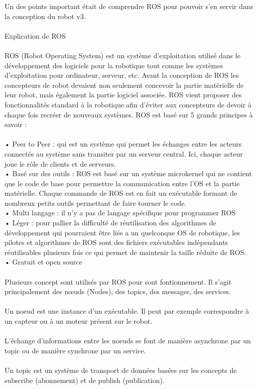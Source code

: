 \documentclass{PackagerQualityN}
\begin{document}
Un des points important était de comprendre ROS pour pouvoir s'en servir dans la conception du robot v3.\\
\\
Explication de ROS\\
\\
ROS (Robot Operating System) est un système d’exploitation utilisé dans le développement des logiciels pour la robotique tout comme les systèmes d’exploitation pour ordinateur, serveur, etc.
Avant la conception de ROS les concepteurs de robot devaient non seulement concevoir la partie matérielle de leur robot, mais également la partie logiciel associée. ROS vient proposer des fonctionnalités standard à la robotique afin d’éviter aux concepteurs de devoir à chaque fois recréer de nouveaux systèmes. ROS est basé sur 5 grands principes à savoir : \\
\\
•	Peer to Peer : qui est un système qui permet les échanges entre les acteurs connectés au système sans transiter par un serveur central. Ici, chaque acteur joue le rôle de clients et de serveurs.\\
•	Basé sur des outils : ROS est basé sur un système microkernel qui ne contient que le code de base pour permettre la communication entre l’OS et la partie matérielle. Chaque commande de ROS est en fait un exécutable formant de nombreux petits outils permettant de faire tourner le code.\\
•	Multi langage : il n’y a pas de langage spécifique pour programmer ROS\\
•	Léger : pour pallier la difficulté de réutilisation des algorithmes de développement qui pourraient être liés a un quelconque OS de robotique, les pilotes et algorithmes de ROS sont des fichiers exécutables indépendants réutilisables plusieurs fois ce qui permet de maintenir la taille réduite de ROS.\\
•	Gratuit et open source\\
\\
Plusieurs concept sont utilisés par ROS pour sont fontionnement. Il s'agit principalement des nœuds (Nodes), des topics, des messages, des services. \\
\\
Un noeud est une instance d'un exécutable. Il peut par exemple correspondre à un capteur ou à un moteur présent sur le robot.\\
\\
L'échange d'informations entre les noeuds se font de manière asynchrone par un topic ou de manière synchrone par un service.\\
\\
Un topic est un système de transport de données basées sur les concepts de subscribe (abonnement) et de publish (publication).
\end{document}
